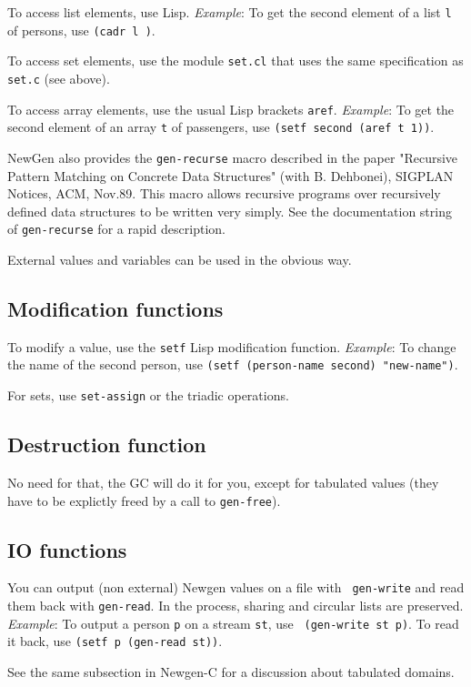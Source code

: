 To access list elements, use Lisp.  {\em Example}: To get the second
element of a list {\tt l} of persons, use {\tt (cadr l )}.

To access set elements, use the module {\tt set.cl} that uses the same
specification as {\tt set.c} (see above).

To access array elements, use the usual Lisp brackets {\tt aref}.
{\em Example}: To get the second element of an array {\tt t} of passengers,
use {\tt (setf second (aref t 1))}.

NewGen also provides the {\tt gen-recurse} macro described in the paper
"Recursive Pattern Matching on Concrete Data Structures" (with B.
Dehbonei), SIGPLAN Notices, ACM, Nov.89.  This macro allows recursive
programs over recursively defined data structures to be written very
simply.  See the documentation string of {\tt gen-recurse} for a rapid
description.

External values and variables can be used in the obvious way.

\subsection{Modification functions}

To modify a value, use the {\tt setf} Lisp modification function.
{\em Example}: To change the name of the second person, use
{\tt (setf (person-name second) "new-name")}.

For sets, use {\tt set-assign} or the triadic operations.

\subsection{Destruction function}

No need for that, the GC will do it for you, except for tabulated values
(they have to be explictly freed by a call to {\tt gen-free}).

\subsection{IO functions}

You can output (non external) Newgen values on a file with {\tt
gen-write} and read them back with {\tt gen-read}. In the process,
sharing and circular lists are preserved.
{\em Example}: To output a person {\tt p} on a stream {\tt st}, use {\tt
(gen-write st p)}. To read it back, use {\tt (setf p (gen-read st))}.

See the same subsection in Newgen-C for a discussion about tabulated
domains. 

